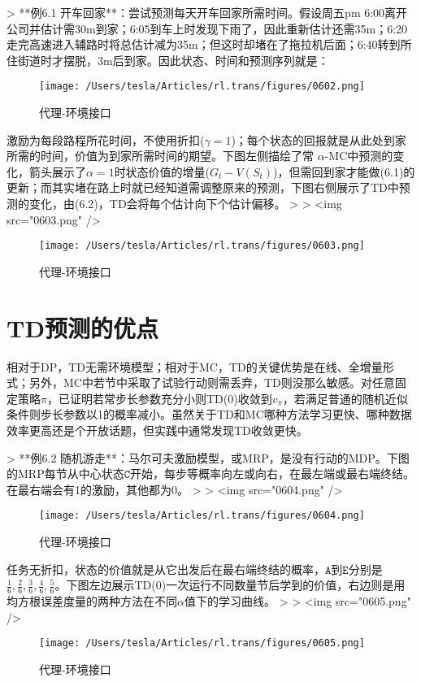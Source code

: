 \documentclass{ctexart}
\begin{document}
> **例6.1 开车回家**：尝试预测每天开车回家所需时间。假设周五pm 6:00离开公司并估计需30m到家；6:05到车上时发现下雨了，因此重新估计还需35m；6:20走完高速进入辅路时将总估计减为35m；但这时却堵在了拖拉机后面；6:40转到所住街道时才摆脱，3m后到家。因此状态、时间和预测序列就是：

\begin{figure}[htbp]
    \centering
    \texttt{[image: /Users/tesla/Articles/rl.trans/figures/0602.png]}
    \caption{代理-环境接口}
    \label{fig:0602} 
\end{figure}

激励为每段路程所花时间，不使用折扣($\gamma=1$)；每个状态的回报就是从此处到家所需的时间，价值为到家所需时间的期望。下图左侧描绘了常 $\alpha$-MC中预测的变化，箭头展示了$\alpha=1$时状态价值的增量($G_t-V(S_t)$)，但需回到家才能做(6.1)的更新；而其实堵在路上时就已经知道需调整原来的预测，下图右侧展示了TD中预测的变化，由(6.2)，TD会将每个估计向下个估计偏移。
>
> <img src="0603.png" />
\begin{figure}[htbp]
    \centering
    \texttt{[image: /Users/tesla/Articles/rl.trans/figures/0603.png]}
    \caption{代理-环境接口}
    \label{fig:0603} 
\end{figure}



\section{TD预测的优点}

相对于DP，TD无需环境模型；相对于MC，TD的关键优势是在线、全增量形式；另外，MC中若节中采取了试验行动则需丢弃，TD则没那么敏感。对任意固定策略$\pi$，已证明若常步长参数充分小则TD(0)收敛到$v_\pi$，若满足普通的随机近似条件则步长参数以1的概率减小。虽然关于TD和MC哪种方法学习更快、哪种数据效率更高还是个开放话题，但实践中通常发现TD收敛更快。

> **例6.2 随机游走**：马尔可夫激励模型，或MRP，是没有行动的MDP。下图的MRP每节从中心状态$\mathtt C$开始，每步等概率向左或向右，在最左端或最右端终结。在最右端会有1的激励，其他都为0。
>
> <img src="0604.png" />
\begin{figure}[htbp]
    \centering
    \texttt{[image: /Users/tesla/Articles/rl.trans/figures/0604.png]}
    \caption{代理-环境接口}
    \label{fig:0604} 
\end{figure}

任务无折扣，状态的价值就是从它出发后在最右端终结的概率，$\mathtt A$到$\mathtt E$分别是$\frac16,\frac26,\frac36,\frac46,\frac56$。下图左边展示TD(0)一次运行不同数量节后学到的价值，右边则是用均方根误差度量的两种方法在不同$\alpha$值下的学习曲线。 
>
> <img src="0605.png" />
\begin{figure}[htbp]
    \centering
    \texttt{[image: /Users/tesla/Articles/rl.trans/figures/0605.png]}
    \caption{代理-环境接口}
    \label{fig:0605} 
\end{figure}
\end{document}
